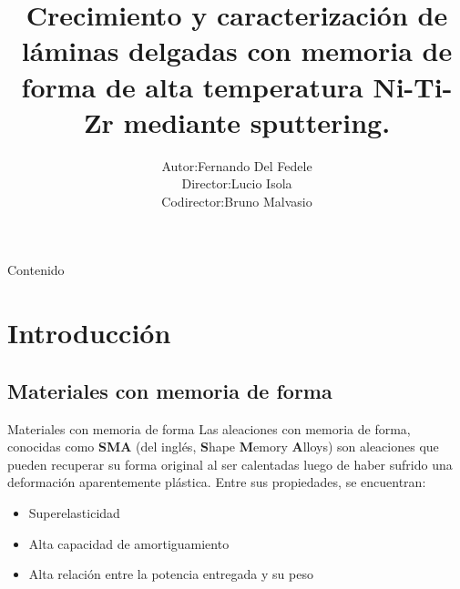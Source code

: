 \documentclass[11pt]{beamer}
\begin{document}
\author{\begin{tabular}{r@{ }l} 
Autor:      & Fernando Del Fedele \\[1ex] 
Director: & Lucio Isola\\
Codirector: & Bruno Malvasio
\end{tabular}}
\title{Crecimiento y caracterización de
láminas delgadas con memoria de
forma de alta temperatura Ni-Ti-Zr
mediante sputtering.}

\begin{frame}
\titlepage
\end{frame}

\begin{frame}[allowframebreaks]{Contenido}
\tableofcontents
\end{frame}

\section{Introducción}

	\subsection{Materiales con memoria de forma}
		\begin{frame}{Materiales con memoria de forma}
			Las aleaciones con memoria de forma, conocidas como \textbf{SMA} (del inglés, \textbf{S}hape \textbf{M}emory \textbf{A}lloys) son aleaciones que pueden recuperar su forma original al ser calentadas luego de haber sufrido una deformación aparentemente plástica.
			Entre sus propiedades, se encuentran:
			\begin{itemize}
				\item Superelasticidad
				\item Alta capacidad de amortiguamiento
				\item Alta relación entre la potencia entregada y su peso
			\end{itemize}
		\end{frame}
			
\end{document}
